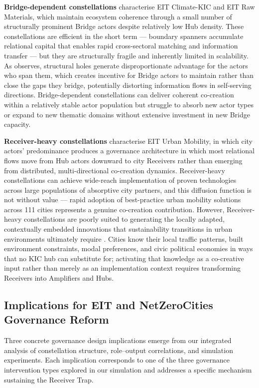 \documentclass[review,12pt]{elsarticle}
\begin{document}
\textbf{Bridge-dependent constellations} characterise EIT Climate-KIC and EIT Raw Materials, which maintain ecosystem coherence through a small number of structurally prominent Bridge actors despite relatively low Hub density. These constellations are efficient in the short term --- boundary spanners accumulate relational capital that enables rapid cross-sectoral matching and information transfer --- but they are structurally fragile and inherently limited in scalability. As \citet{burt2004structural} observes, structural holes generate disproportionate advantage for the actors who span them, which creates incentive for Bridge actors to maintain rather than close the gaps they bridge, potentially distorting information flows in self-serving directions. Bridge-dependent constellations can deliver coherent co-creation within a relatively stable actor population but struggle to absorb new actor types or expand to new thematic domains without extensive investment in new Bridge capacity.

\textbf{Receiver-heavy constellations} characterise EIT Urban Mobility, in which city actors' predominance produces a governance architecture in which most relational flows move from Hub actors downward to city Receivers rather than emerging from distributed, multi-directional co-creation dynamics. Receiver-heavy constellations can achieve wide-reach implementation of proven technologies across large populations of absorptive city partners, and this diffusion function is not without value --- rapid adoption of best-practice urban mobility solutions across 111 cities represents a genuine co-creation contribution. However, Receiver-heavy constellations are poorly suited to generating the locally adapted, contextually embedded innovations that sustainability transitions in urban environments ultimately require \citep{avelino2016shifting}. Cities know their local traffic patterns, built environment constraints, modal preferences, and civic political economies in ways that no KIC hub can substitute for; activating that knowledge as a co-creative input rather than merely as an implementation context requires transforming Receivers into Amplifiers and Hubs.

\subsection{Implications for EIT and NetZeroCities Governance Reform}

Three concrete governance design implications emerge from our integrated analysis of constellation structure, role--output correlations, and simulation experiments. Each implication corresponds to one of the three governance intervention types explored in our simulation and addresses a specific mechanism sustaining the Receiver Trap.
\end{document}

